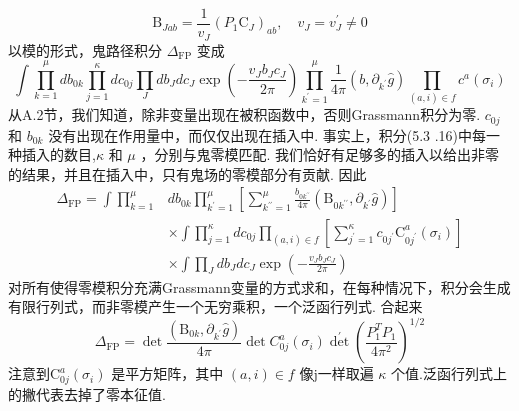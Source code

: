 \begin{equation}
	\mathrm{B}_{J a b}=\frac{1}{v_{J}}\left(P_{1} \mathrm{C}_{J}\right)_{a b}, \quad v_{J}=v_{J}^{\prime} \neq 0
\end{equation}
以模的形式，鬼路径积分 $\Delta_{\mathrm{FP}}$ 变成
\begin{equation}
	\int \prod_{k=1}^{\mu} d b_{0 k} \prod_{j=1}^{\kappa} d c_{0 j} \prod_{J} d b_{J} d c_{J} \exp \left(-\frac{v_{J} b_{J} c_{J}}{2 \pi}\right) \prod_{k^{\prime}=1}^{\mu} \frac{1}{4 \pi}\left(b, \partial_{k^{\prime}} \hat{g}\right) \prod_{(a, i) \in f} c^{a}\left(\sigma_{i}\right)
\end{equation}
从A.2节，我们知道，除非变量出现在被积函数中，否则Grassmann积分为零. $c_{0 j}$ 和 $b_{0 k}$ 没有出现在作用量中，而仅仅出现在插入中. 事实上，积分(5.3 .16)中每一种插入的数目,$ \kappa$ 和 $\mu$ ，分别与鬼零模匹配. 我们恰好有足够多的插入以给出非零的结果，并且在插入中，只有鬼场的零模部分有贡献. 因此
\begin{equation}
	\begin{aligned}
		\Delta_{\mathrm{FP}}=\int \prod_{k=1}^{\mu} & d b_{0 k} \prod_{k^{\prime}=1}^{\mu}\left[\sum_{k^{\prime \prime}=1}^{\mu} \frac{b_{0 k^{\prime \prime}}}{4 \pi}\left(\mathrm{B}_{0 k^{\prime \prime}}, \partial_{k^{\prime}} \hat{g}\right)\right] \\
		& \times \int \prod_{j=1}^{\kappa} d c_{0 j} \prod_{(a, i) \in f}\left[\sum_{j^{\prime}=1}^{\kappa} c_{0 j^{\prime}} \mathrm{C}_{0 j^{\prime}}^{a}\left(\sigma_{i}\right)\right] \\
		& \times \int \prod_{J} d b_{J} d c_{J} \exp \left(-\frac{v_{J} b_{J} c_{J}}{2 \pi}\right)
	\end{aligned}
\end{equation}
对所有使得零模积分充满Grassmann变量的方式求和，在每种情况下，积分会生成有限行列式，而非零模产生一个无穷乘积，一个泛函行列式. 合起来
\begin{equation}
	\Delta_{\mathrm{FP}}=\operatorname{det} \frac{\left(\mathrm{B}_{0 k}, \partial_{k^{\prime}} \hat{g}\right)}{4 \pi} \operatorname{det} C_{0 j}^{a}\left(\sigma_{i}\right) \operatorname{det}^{\prime}\left(\frac{P_{1}^{T} P_{1}}{4 \pi^{2}}\right)^{1 / 2}
\end{equation}
注意到$\mathrm{C}_{0 j}^{a}\left(\sigma_{i}\right)$ 是平方矩阵，其中 $(a, i) \in f$ 像j一样取遍 $\kappa$ 个值.泛函行列式上的撇代表去掉了零本征值.\\

